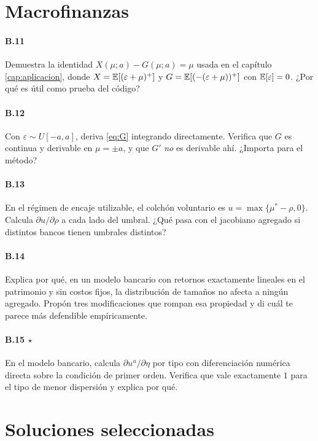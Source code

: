 \section{Macrofinanzas}

\paragraph{B.11} Demuestra la identidad $X(\mu;a) - G(\mu;a) = \mu$ usada en el
capítulo \ref{cap:aplicacion}, donde $X=\mathbb{E}[(\varepsilon+\mu)^+]$ y
$G=\mathbb{E}[(-(\varepsilon+\mu))^+]$ con $\mathbb{E}[\varepsilon]=0$. ¿Por qué es útil como
prueba del código?

\paragraph{B.12} Con $\varepsilon\sim U[-a,a]$, deriva \eqref{eq:G} integrando
directamente. Verifica que $G$ es continua y derivable en $\mu=\pm a$, y que
$G'$ \emph{no} es derivable ahí. ¿Importa para el método?

\paragraph{B.13} En el régimen de encaje utilizable, el colchón voluntario es
$u = \max\{\mu^*-\rho, 0\}$. Calcula $\partial u/\partial\rho$ a cada lado del
umbral. ¿Qué pasa con el jacobiano agregado si distintos bancos tienen umbrales
distintos?

\paragraph{B.14} Explica por qué, en un modelo bancario con retornos exactamente
lineales en el patrimonio y sin costos fijos, la distribución de tamaños no
afecta a ningún agregado. Propón tres modificaciones que rompan esa propiedad y
di cuál te parece más defendible empíricamente.

\paragraph{B.15 $\star$} En el modelo bancario, calcula $\partial u^u/\partial\eta$
por tipo con diferenciación numérica directa sobre la condición de primer orden.
Verifica que vale exactamente $1$ para el tipo de menor dispersión y explica por
qué.

\section{Soluciones seleccionadas}

